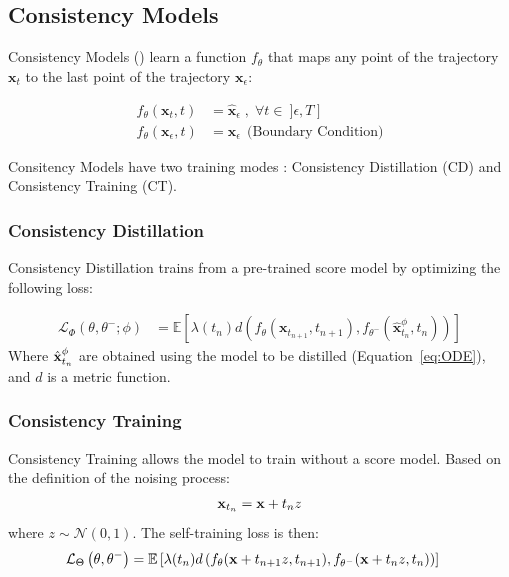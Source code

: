 \subsection{Consistency Models}

Consistency Models (\cite{song2023consistencymodels}) learn a function $f_{\theta}$ that maps any point of the trajectory $\mathbf{x}_t $ to the last point of the trajectory $\mathbf{x}_{\epsilon}$:

\begin{align}
  f_{\theta}(\mathbf{x}_t, t) &= \widehat{\mathbf{x}}_{\epsilon} \;, \; \forall t \in \: ]\epsilon, T\:] \\
  f_{\theta}(\mathbf{x}_{\epsilon}, t) &= \mathbf{x}_{\epsilon} \: \: \text{(Boundary Condition)}
\end{align}

\noindent Consitency Models have two training modes : Consistency Distillation (CD) and Consistency Training (CT). 

\subsubsection{Consistency Distillation}
Consistency Distillation trains from a pre-trained score model by optimizing the following loss:

\begin{align}
    \mathcal{L}_{\Phi} \left(\theta, \theta^-; \phi \right) &= \mathbb{E}\left[ \lambda(t_n) d \left(f_{\theta} (\mathbf{x}_{t_{n+1}}, t_{n+1}), f_{\theta^-} (\widehat{\mathbf{x}}_{t_{n}}^{\phi}, t_{n}) \right)\right] \label{def:loss}
\end{align}
\noindent Where $\hat{\mathbf{x}}_{t_n}^{\phi}$ are obtained using the model to be distilled (Equation~\ref{eq:ODE}), and $d$ is a metric function.

\subsubsection{Consistency Training}
Consistency Training allows the model to train without a score model. Based on the definition of the noising process:
\begin{align}
    \mathbf{x}_{t_n} = \mathbf{x} + t_nz \label{def:xtn}
\end{align}
\noindent where $z \sim \mathcal{N}(0, 1)$. The self-training loss is then:
\begin{align}
    \mathcal{L}_{\Theta} \left(\theta, \theta^-\right) &= \mathbb{E}\left[ \lambda(t_n) d \left(f_{\theta}(\mathbf{x} + t_{n+1}z, t_{n+1}), f_{\theta^-}(\mathbf{x} + t_nz, t_{n}) \right)\right] \label{def:selfloss}
\end{align}

